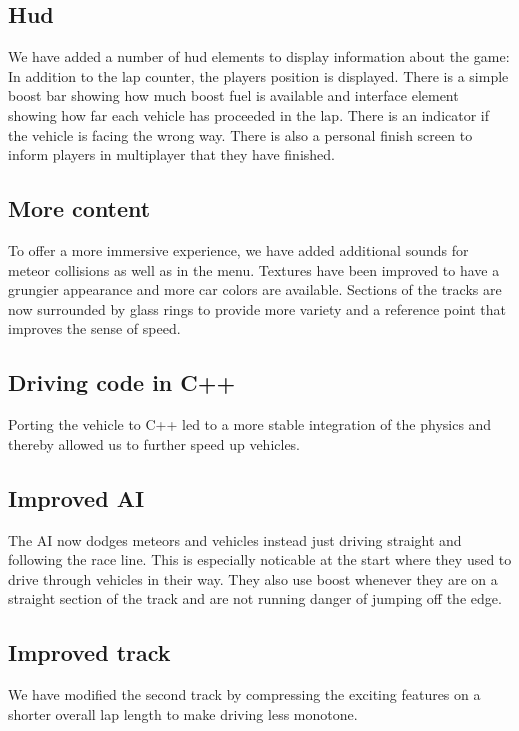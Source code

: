 \documentclass[11pt]{article}
\begin{document}
\subsection{Hud}

We have added a number of hud elements to display information about the game: In addition to the lap counter, the players position is displayed. There is a simple boost bar showing how much boost fuel is available and interface element showing how far each vehicle has proceeded in the lap. There is an indicator if the vehicle is facing the wrong way. There is also a personal finish screen to inform players in multiplayer that they have finished.

\subsection{More content}

To offer a more immersive experience, we have added additional sounds for meteor collisions as well as in the menu. Textures have been improved to have a grungier appearance and more car colors are available. Sections of the tracks are now surrounded by glass rings to provide more variety and a reference point that improves the sense of speed.

\subsection{Driving code in C++}

Porting the vehicle to C++ led to a more stable integration of the physics and thereby allowed us to further speed up vehicles. 

\subsection{Improved AI}

The AI now dodges meteors and vehicles instead just driving straight and following the race line. This is especially noticable at the start where they used to drive through vehicles in their way. They also use boost whenever they are on a straight section of the track and are not running danger of jumping off the edge. 

\subsection{Improved track}

We have modified the second track by compressing the exciting features on a shorter overall lap length to make driving less monotone.
\end{document}
